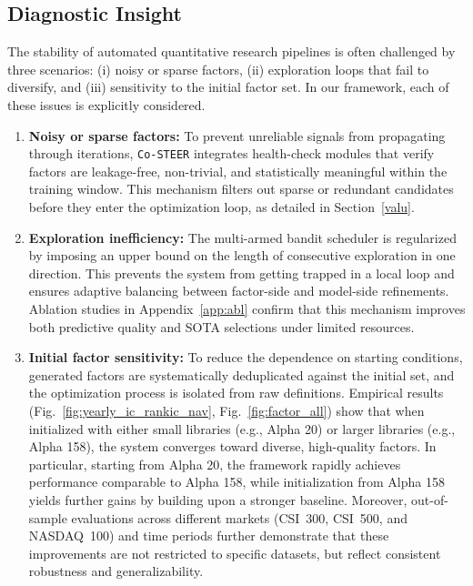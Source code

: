 \documentclass{article}
\begin{document}
\subsection{Diagnostic Insight}
The stability of automated quantitative research pipelines is often challenged by three scenarios: (i) noisy or sparse factors, (ii) exploration loops that fail to diversify, and (iii) sensitivity to the initial factor set. In our framework, each of these issues is explicitly considered.
\begin{enumerate}[leftmargin=4ex]
    \item \textbf{Noisy or sparse factors:} To prevent unreliable signals from propagating through iterations, \texttt{Co-STEER} integrates health-check modules that verify factors are leakage-free, non-trivial, and statistically meaningful within the training window. This mechanism filters out sparse or redundant candidates before they enter the optimization loop, as detailed in Section~\ref{valu}.
    
    \item \textbf{Exploration inefficiency:} The multi-armed bandit scheduler is regularized by imposing an upper bound on the length of consecutive exploration in one direction. This prevents the system from getting trapped in a local loop and ensures adaptive balancing between factor-side and model-side refinements. Ablation studies in Appendix~\ref{app:abl} confirm that this mechanism improves both predictive quality and SOTA selections under limited resources.
    
    \item \textbf{Initial factor sensitivity:} To reduce the dependence on starting conditions, generated factors are systematically deduplicated against the initial set, and the optimization process is isolated from raw definitions. Empirical results (Fig.~\ref{fig:yearly_ic_rankic_nav}, Fig.~\ref{fig:factor_all}) show that when initialized with either small libraries (e.g., Alpha 20) or larger libraries (e.g., Alpha 158), the system converges toward diverse, high-quality factors. In particular, starting from Alpha 20, the framework rapidly achieves performance comparable to Alpha 158, while initialization from Alpha 158 yields further gains by building upon a stronger baseline. Moreover, out-of-sample evaluations across different markets (CSI~300, CSI~500, and NASDAQ~100) and time periods further demonstrate that these improvements are not restricted to specific datasets, but reflect consistent robustness and generalizability.
\end{enumerate}
\end{document}
